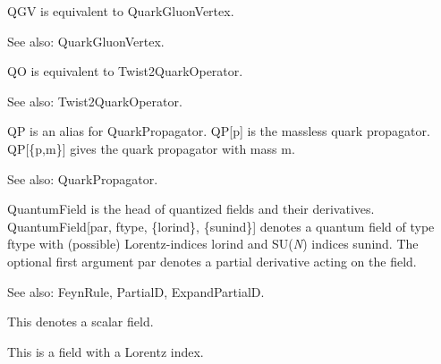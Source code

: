 

QGV is equivalent to QuarkGluonVertex.

See also:  QuarkGluonVertex.



QO is equivalent to Twist2QuarkOperator.

See also:  Twist2QuarkOperator.



QP is an alias for QuarkPropagator. QP[p] is the massless quark propagator. QP[\{p,m\}] gives the { }quark propagator with mass m.

See also:  QuarkPropagator.



QuantumField is the head of quantized fields and their derivatives. QuantumField[par, ftype, \{lorind\}, \{sunind\}] denotes a quantum
  field of type ftype with (possible) Lorentz-indices lorind and SU({\itshape N}) indices sunind. The optional first argument par denotes a partial
derivative acting on the field.

See also:  FeynRule, PartialD, ExpandPartialD.


This denotes a scalar field.







This is a field with a Lorentz index.



